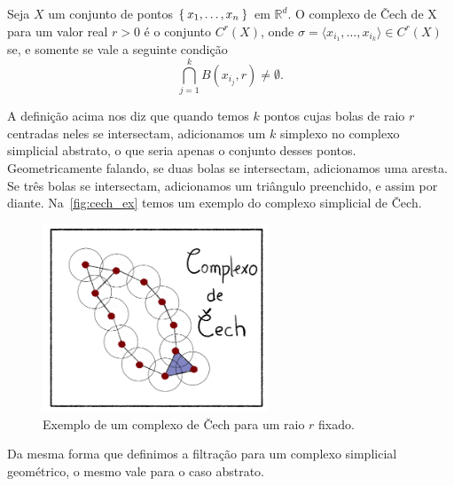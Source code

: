 \begin{defi}
  Seja $X$ um conjunto de pontos $\Set{x_1, \dots, x_n}$ em $\mathbb{R}^d$. O complexo
  de \v{C}ech de X para um valor real $r>0$ é o conjunto $C^r(X)$, onde
  $\sigma = \langle x_{i_1}, \dots, x_{i_k} \rangle \in C^r(X)$ se, e somente se vale a seguinte
  condição
  \begin{equation*}
    \bigcap_{j=1}^k B(x_{i_j},r) \neq \emptyset.
  \end{equation*}
\end{defi}
A definição acima nos diz que quando temos $k$ pontos cujas bolas de raio $r$
centradas neles se intersectam, adicionamos um $k$ simplexo no complexo simplicial
abstrato, o que seria apenas o conjunto desses pontos. Geometricamente falando,
se duas bolas se intersectam, adicionamos uma aresta. Se três bolas se intersectam,
adicionamos um triângulo preenchido, e assim por diante. Na~\autoref{fig:cech_ex}
temos um exemplo do complexo simplicial de \v{C}ech.
\begin{figure}[!htpb]
  \centering
  \includegraphics[width=0.6\textwidth]{images/ComplexCech.png}
  \caption{Exemplo de um complexo de \v{C}ech para um raio $r$ fixado.}
  \label{fig:cech_ex}
  \fautor
\end{figure}

Da mesma forma que definimos a filtração para um complexo simplicial geométrico,
o mesmo vale para o caso abstrato.


